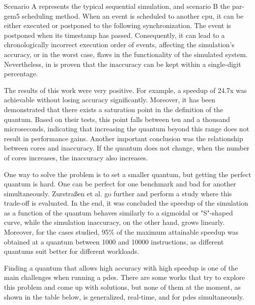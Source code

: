 Scenario A represents the typical sequential simulation, and scenario B the par-gem5 scheduling method. When an event is scheduled to another 
\gls{cpu}, it can be either executed or postponed to the following synchronization. The event is postponed when its timestamp has passed. 
Consequently, it can lead to a chronologically incorrect execution order of events, affecting the simulation's accuracy, or in the worst case, 
flaws in the functionality of the simulated system. Nevertheless, in \cite{pargem5} is proven that the inaccuracy can be kept within a single-digit 
percentage.

The results of this work were very positive. For example, a speedup of 24.7x was achievable without losing accuracy significantly. Moreover, 
it has been demonstrated that there exists a saturation point in the definition of the quantum. Based on their tests, this point falls between 
ten and a thousand microseconds, indicating that increasing the quantum beyond this range does not result in performance gains. Another 
important conclusion was the relationship between cores and inaccuracy. If the quantum does not change, when the number of cores increases, the 
inaccuracy also increases. 

One way to solve the problem is to set a smaller quantum, but getting the perfect quantum is hard. One can be perfect for one benchmark and 
bad for another simultaneously. Zurstraßen et al. \cite{BeyondQuantumTDSim} go further and perform a study where this trade-off is evaluated. 
In the end, it was concluded the speedup of the simulation as a function of the quantum behaves similarly to a sigmoidal or "S"-shaped curve, while 
the simulation inaccuracy, on the other hand, grows linearly. Moreover, for the cases studied, 95\% of the maximum attainable speedup was 
obtained at a quantum between 1000 and 10000 instructions, as different quantums suit better for different workloads.

Finding a quantum that allows high accuracy with high speedup is one of the main challenges when running a \gls{pdes}. There are some works 
that try to explore this problem and come up with solutions, but none of them at the moment, as shown in the table below, is generalized, 
real-time, and for \gls{pdes} simultaneously. 

